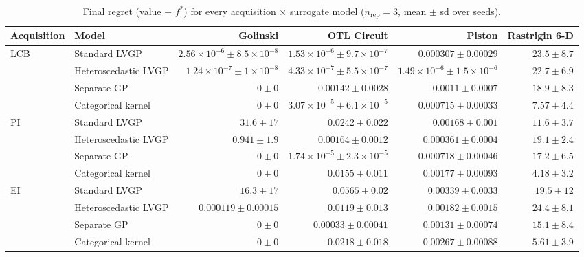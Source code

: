 \begin{table}[htbp]
\centering
\small
\setlength{\tabcolsep}{4pt}
\setlength{\fboxsep}{2pt}
\caption{Final regret (value $-$ $f^*$) for every acquisition $\times$ surrogate model ($n_{\mathrm{rep}}=3$, mean $\pm$ sd over seeds).}
\label{tab:regret_nrep03}
\begin{tabular}{llrrrr}
\toprule
Acquisition & Model & Golinski & OTL Circuit & Piston & Rastrigin 6-D \\
\midrule
LCB & Standard LVGP & $2.56{\times}10^{-6} \pm 8.5{\times}10^{-8}$ & $1.53{\times}10^{-6} \pm 9.7{\times}10^{-7}$ & $0.000307 \pm 0.00029$ & $23.5 \pm 8.7$ \\
 & Heteroscedastic LVGP & $1.24{\times}10^{-7} \pm 1{\times}10^{-8}$ & \colorbox{green!20}{{\boldmath$4.33{\times}10^{-7} \pm 5.5{\times}10^{-7}$}} & \colorbox{green!20}{{\boldmath$1.49{\times}10^{-6} \pm 1.5{\times}10^{-6}$}} & $22.7 \pm 6.9$ \\
 & Separate GP & \colorbox{green!20}{{\boldmath$0 \pm 0$}} & $0.00142 \pm 0.0028$ & $0.0011 \pm 0.0007$ & $18.9 \pm 8.3$ \\
 & Categorical kernel & \colorbox{green!20}{{\boldmath$0 \pm 0$}} & $3.07{\times}10^{-5} \pm 6.1{\times}10^{-5}$ & $0.000715 \pm 0.00033$ & {\boldmath$7.57 \pm 4.4$} \\
\midrule
PI & Standard LVGP & $31.6 \pm 17$ & $0.0242 \pm 0.022$ & $0.00168 \pm 0.001$ & $11.6 \pm 3.7$ \\
 & Heteroscedastic LVGP & $0.941 \pm 1.9$ & $0.00164 \pm 0.0012$ & {\boldmath$0.000361 \pm 0.0004$} & $19.1 \pm 2.4$ \\
 & Separate GP & \colorbox{green!20}{{\boldmath$0 \pm 0$}} & {\boldmath$1.74{\times}10^{-5} \pm 2.3{\times}10^{-5}$} & $0.000718 \pm 0.00046$ & $17.2 \pm 6.5$ \\
 & Categorical kernel & \colorbox{green!20}{{\boldmath$0 \pm 0$}} & $0.0155 \pm 0.011$ & $0.00177 \pm 0.00093$ & \colorbox{green!20}{{\boldmath$4.18 \pm 3.2$}} \\
\midrule
EI & Standard LVGP & $16.3 \pm 17$ & $0.0565 \pm 0.02$ & $0.00339 \pm 0.0033$ & $19.5 \pm 12$ \\
 & Heteroscedastic LVGP & $0.000119 \pm 0.00015$ & $0.0119 \pm 0.013$ & $0.00182 \pm 0.0015$ & $24.4 \pm 8.1$ \\
 & Separate GP & \colorbox{green!20}{{\boldmath$0 \pm 0$}} & {\boldmath$0.00033 \pm 0.00041$} & {\boldmath$0.00131 \pm 0.00074$} & $15.1 \pm 8.4$ \\
 & Categorical kernel & \colorbox{green!20}{{\boldmath$0 \pm 0$}} & $0.0218 \pm 0.018$ & $0.00267 \pm 0.00088$ & {\boldmath$5.61 \pm 3.9$} \\

\end{tabular}
\end{table}
